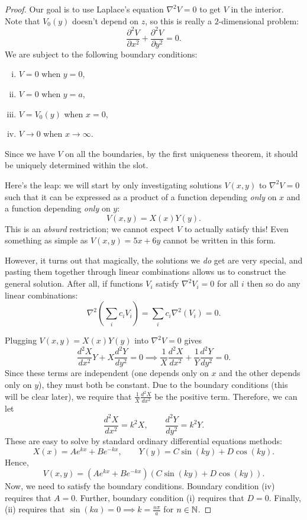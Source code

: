 \begin{proof}
Our goal is to use Laplace's equation $\nabla^2V=0$ to get $V$ in the interior. Note that $V_0(y)$ doesn't depend on $z$, so this is really a $2$-dimensional problem:
\[\frac{\partial^2V}{\partial x^2}+\frac{\partial^2V}{\partial y^2}=0.\]
We are subject to the following boundary conditions:
\begin{enumerate}[(i)]
    \item $V=0$ when $y=0$,
    \item $V=0$ when $y=a$,
    \item $V=V_0(y)$ when $x=0$,
    \item $V\to 0$ when $x\to\infty$.
\end{enumerate}
Since we have $V$ on all the boundaries, by the first uniqueness theorem, it should be uniquely determined within the slot.

Here's the leap: we will start by only investigating solutions $V(x,y)$ to $\nabla^2V=0$ such that it can be expressed as a product of a function depending \textit{only} on $x$ and a function depending \textit{only} on $y$:
\[V(x,y)=X(x)Y(y).\]
This is an \textit{absurd} restriction; we cannot expect $V$ to actually satisfy this! Even something as simple as $V(x,y)=5x+6y$ cannot be written in this form.

However, it turns out that magically, the solutions we \textit{do} get are very special, and pasting them together through linear combinations allows us to construct the general solution. After all, if functions $V_i$ satisfy $\nabla^2 V_i=0$ for all $i$ then so do any linear combinations:
\[\nabla^2\left(\sum_ic_iV_i\right)=\sum_{i}c_i\nabla^2(V_i)=0.\]

Plugging $V(x,y)=X(x)Y(y)$ into $\nabla^2 V=0$ gives
\[\frac{d^2X}{dx^2}Y+X\frac{d^2Y}{dy^2}=0\implies \frac{1}{X}\frac{d^2X}{dx^2}+\frac{1}{Y}\frac{d^2Y}{dy^2}=0.\]
Since these terms are independent (one depends only on $x$ and the other depends only on $y$), they must both be constant. Due to the boundary conditions (this will be clear later), we require that $\frac{1}{X}\frac{d^2X}{dx^2}$ be the positive term. Therefore, we can let
\[\frac{d^2X}{dx^2}=k^2X, \qquad \frac{d^2Y}{dy^2}=k^2Y.\]
These are easy to solve by standard ordinary differential equations methods:
\[X(x)=Ae^{kx}+Be^{-kx}, \qquad Y(y)=C\sin(ky)+D\cos(ky).\]
Hence,
\[V(x,y)=(Ae^{kx}+Be^{-kx})(C\sin(ky)+D\cos(ky)).\]
Now, we need to satisfy the boundary conditions. Boundary condition (iv) requires that $A=0$. Further, boundary condition (i) requires that $D=0$. Finally, (ii) requires that $\sin(ka)=0\implies k=\frac{n\pi}{a}$ for $n\in \mathbb N$. 


\end{proof}
